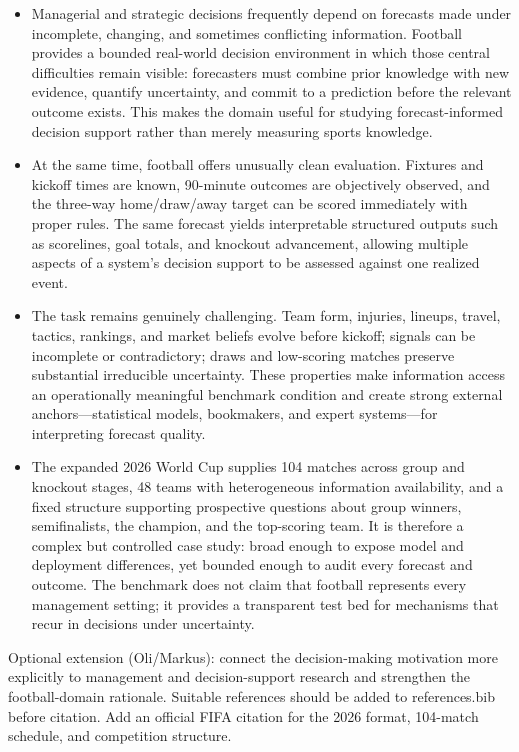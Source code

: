\documentclass[sigconf,review]{acmart}
\newenvironment{draftbullets}
  {\begin{itemize}[leftmargin=1.25em,itemsep=1.5pt,topsep=2pt,parsep=0pt,partopsep=0pt]}
  {\end{itemize}}
\newcommand{\TODO}[1]{{\color{red}#1}}
\begin{document}
\begin{draftbullets}
  \item Managerial and strategic decisions frequently depend on forecasts made under incomplete,
  changing, and sometimes conflicting information. Football provides a bounded real-world decision
  environment in which those central difficulties remain visible: forecasters must combine prior
  knowledge with new evidence, quantify uncertainty, and commit to a prediction before the relevant
  outcome exists. This makes the domain useful for studying forecast-informed decision support rather
  than merely measuring sports knowledge.

  \item At the same time, football offers unusually clean evaluation. Fixtures and kickoff times are
  known, 90-minute outcomes are objectively observed, and the three-way home/draw/away target can be
  scored immediately with proper rules. The same forecast yields interpretable structured outputs
  such as scorelines, goal totals, and knockout advancement, allowing multiple aspects of a system's
  decision support to be assessed against one realized event.

  \item The task remains genuinely challenging. Team form, injuries, lineups, travel, tactics,
  rankings, and market beliefs evolve before kickoff; signals can be incomplete or contradictory;
  draws and low-scoring matches preserve substantial irreducible uncertainty. These properties make
  information access an operationally meaningful benchmark condition and create strong external
  anchors---statistical models, bookmakers, and expert systems---for interpreting forecast quality.

  \item The expanded 2026 World Cup supplies 104 matches across group and knockout stages, 48 teams
  with heterogeneous information availability, and a fixed structure supporting prospective questions
  about group winners, semifinalists, the champion, and the top-scoring team. It is therefore a
  complex but controlled case study: broad enough to expose model and deployment differences, yet
  bounded enough to audit every forecast and outcome. The benchmark does not claim that football
  represents every management setting; it provides a transparent test bed for mechanisms that recur
  in decisions under uncertainty.
\end{draftbullets}

\TODO{Optional extension (Oli/Markus): connect the decision-making motivation more explicitly to management and decision-support research and strengthen the football-domain rationale. Suitable references should be added to references.bib before citation. Add an official FIFA citation for the 2026 format, 104-match schedule, and competition structure.}
\end{document}
